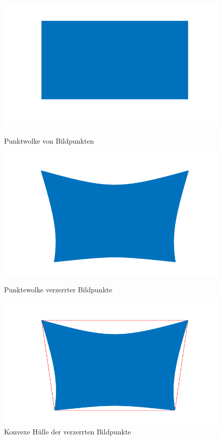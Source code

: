 \begin{figure}[h]
	\begin{minipage}{.3\textwidth}
		\centering
		\includegraphics[width=\textwidth]{img/pc.png}
		\caption{Punktwolke von Bildpunkten}
		\label{fig:pointcloud}
	\end{minipage}\begin{minipage}{.3\textwidth}
	\centering
	\includegraphics[width=\textwidth]{img/distortedpc.png}
	\caption{Punktewolke verzerrter Bildpunkte}
	\label{fig:distorted_pointcloud}
\end{minipage}
	\begin{minipage}{.3\textwidth}
		\centering
		\includegraphics[width=\textwidth]{img/convexpc.png}
		\caption{Konvexe Hülle der verzerrten Bildpunkte}
		\label{fig:convex_hull}
	\end{minipage}
\end{figure}

